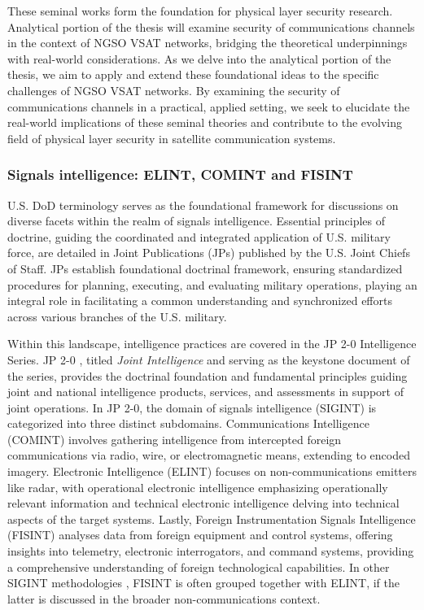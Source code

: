 \documentclass[english, 12pt, a4paper, elec, utf8, a-1b, online]{aaltothesis}
\begin{document}
These seminal works form the foundation for physical layer security research.
Analytical portion of the thesis will examine security of communications channels in the context of NGSO VSAT networks, bridging the theoretical underpinnings with real-world considerations.
As we delve into the analytical portion of the thesis, we aim to apply and extend these foundational ideas to the specific challenges of NGSO VSAT networks.
By examining the security of communications channels in a practical, applied setting, we seek to elucidate the real-world implications of these seminal theories and contribute to the evolving field of physical layer security in satellite communication systems.


\subsubsection{Signals intelligence: ELINT, COMINT and FISINT}
U.S. DoD terminology serves as the foundational framework for discussions on diverse facets within the realm of signals intelligence.
Essential principles of doctrine, guiding the coordinated and integrated application of U.S. military force, are detailed in Joint Publications (JPs) published by the U.S. Joint Chiefs of Staff.
JPs establish foundational doctrinal framework, ensuring standardized procedures for planning, executing, and evaluating military operations, playing an integral role in facilitating a common understanding and synchronized efforts across various branches of the U.S. military.

Within this landscape, intelligence practices are covered in the JP 2-0 Intelligence Series.
JP 2-0 \cite{jp2-0}, titled \textit{Joint Intelligence} and serving as the keystone document of the series, provides the doctrinal foundation and fundamental principles guiding joint and national intelligence products, services, and assessments in support of joint operations.
In JP 2-0, the domain of signals intelligence (SIGINT) is categorized into three distinct subdomains. Communications Intelligence (COMINT) involves gathering intelligence from intercepted foreign communications via radio, wire, or electromagnetic means, extending to encoded imagery.
Electronic Intelligence (ELINT) focuses on non-communications emitters like radar, with operational electronic intelligence emphasizing operationally relevant information and technical electronic intelligence delving into technical aspects of the target systems.
Lastly, Foreign Instrumentation Signals Intelligence (FISINT) analyses data from foreign equipment and control systems, offering insights into telemetry, electronic interrogators, and command systems, providing a comprehensive understanding of foreign technological capabilities.
In other SIGINT methodologies \cite{kosola2013digitaalinen}, FISINT is often grouped together with ELINT, if the latter is discussed in the broader non-communications context.
\end{document}
